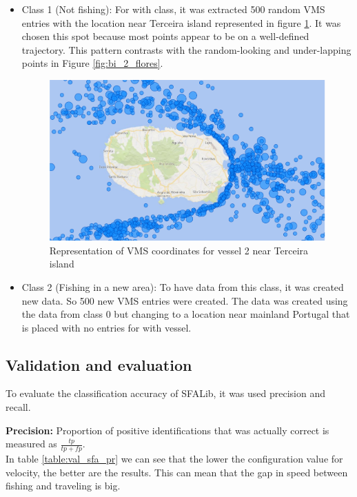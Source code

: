 \begin{itemize}
\item Class 1 (Not fishing): For with class, it was extracted 500 random VMS entries with the location near Terceira island represented in figure \ref{fig:bi_2_travel}. It was chosen this spot because most points appear to be on a well-defined trajectory. This pattern contrasts with the random-looking and under-lapping points in Figure \ref{fig:bi_2_flores}. 

\begin{figure}[]
\centering
\includegraphics[width=0.8\linewidth]{Chapters/img/2viagem.pdf}
\caption{Representation of VMS coordinates for vessel 2 near Terceira island}
\label{fig:bi_2_travel}
\end{figure}



\item Class 2 (Fishing in a new area): To have data from this class, it was created new data. So 500 new VMS entries were created. The data was created using the data from class 0 but changing to a location near mainland Portugal that is placed with no entries for with vessel. 

\end{itemize}




\subsection{Validation and evaluation}
\label{sec:val_SFA_val_eva}

To evaluate the classification accuracy of SFALib, it was used precision and recall.

\textbf{Precision:} Proportion of positive identifications that was actually correct is measured as \(\frac{tp}{tp+fp} \).\\
In table \ref{table:val_sfa_pr} we can see that the lower the configuration value for velocity, the better are the results.
This can mean that the gap in speed between fishing and traveling is big.

